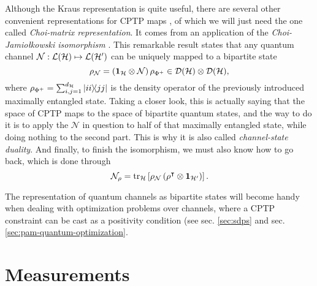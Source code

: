 		Although the Kraus representation is quite useful, there are several other convenient representations for CPTP maps \cite{wood_2015_tensor}, of which we will just need the one called \emph{Choi-matrix representation}. It comes from an application of the \emph{Choi-Jamiołkowski isomorphism} \cite{jamiolkowski,jiang_2013_channelstate}. This remarkable result states that any quantum channel $\mathcal{N} : \mathcal{L}(\mathcal{H}) \mapsto \mathcal{L}(\mathcal{H}^\prime)$ can be uniquely mapped to a bipartite state
		$$
			\rho_{\mathcal{N}} = \left(\mathbf{1}_{\mathcal{H}} \otimes \mathcal{N} \right) \rho_{\Phi^+} \in \mathcal{D}(\mathcal{H}) \otimes \mathcal{D}(\mathcal{H}) ,
		$$
		where $\rho_{\Phi^+} = \sum_{i,j=1}^{d_{\mathcal{H}}} \ketbra{ii}{jj}$ is the density operator of the previously introduced maximally entangled state. Taking a closer look, this is actually saying that the space of CPTP maps to the space of bipartite quantum states, and the way to do it is to apply the $\mathcal{N}$ in question to half of that maximally entangled state, while doing nothing to the second part. This is why it is also called \emph{channel-state duality}. And finally, to finish the isomorphism, we must also know how to go back, which is done through
		$$
			\mathcal{N}_\rho = \text{tr}_{\mathcal{H}}\left[ \rho_{\mathcal{N}} \left( \rho^\intercal \otimes \mathbf{1}_{\mathcal{H}^\prime} \right) \right] .
		$$
		
		The representation of quantum channels as bipartite states will become handy when dealing with optimization problems over channels, where a CPTP constraint can be cast as a positivity condition (see sec. \ref{sec:sdps} and sec. \ref{sec:pam-quantum-optimization}.
		

	\section{Measurements}
	
